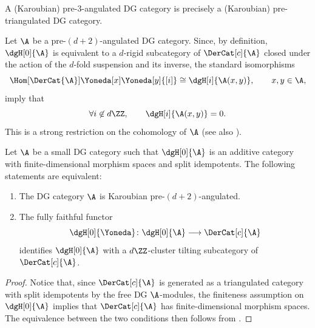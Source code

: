 \documentclass[a4paper]{amsart}
\begin{document}
\begin{remark}
  A (Karoubian) pre-3-angulated DG category is precisely a (Karoubian)
  pre-triangulated DG category.
\end{remark}

\begin{remark}
  \label{rmk:sparseness}
  Let $\A$ be a pre-$(d+2)$-angulated DG category. Since, by definition,
  $\dgH[0]{\A}$ is equivalent to a $d$-rigid subcategory of $\DerCat[c]{\A}$
  closed under the action of the $d$-fold suspension and its inverse, the
  standard isomorphisms
  \[
    \Hom[\DerCat{\A}]{\Yoneda[x]}{\Yoneda[y]{[i]}}\cong\dgH[i]{\A(x,y)},\qquad
    x,y\in\A,
  \]
  imply that
  \[
    \forall i\not\in d\ZZ,\qquad \dgH[i]{\A(x,y)}=0.
  \]
  This is a strong restriction on the cohomology of $\A$ (see also
  ).
\end{remark}

\begin{proposition}
  \label{prop:d+2=dZ-CT}
  Let $\A$ be a small DG category such that $\dgH[0]{\A}$ is an additive
  category with finite-dimensional morphism spaces and split idempotents. The
  following statements are equivalent:
  \begin{enumerate}
  \item The DG category $\A$ is Karoubian pre-$(d+2)$-angulated.
  \item The fully faithful functor
    \[
      \dgH[0]{\Yoneda}\colon\dgH[0]{\A}\longrightarrow\DerCat[c]{\A}
    \]
    identifies $\dgH[0]{\A}$ with a $d\ZZ$-cluster tilting
    subcategory of $\DerCat[c]{\A}$.
  \end{enumerate}
\end{proposition}
\begin{proof}
  Notice that, since $\DerCat[c]{\A}$ is generated as a triangulated category
  with split idempotents by the free DG $\A$-modules, the finiteness assumption
  on $\dgH[0]{\A}$ implies that $\DerCat[c]{\A}$ has finite-dimensional morphism
  spaces. The equivalence between the two conditions then follows from
  .
\end{proof}
\end{document}
